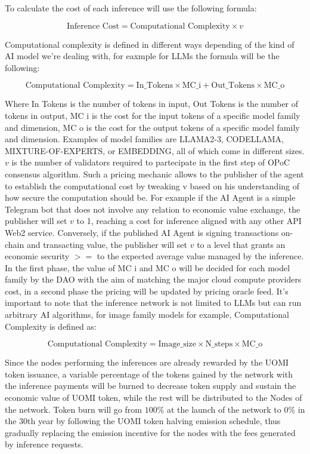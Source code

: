 \documentclass{article}
\begin{document}
To calculate the cost of each inference will use the following formula:





\[ \text{Inference Cost} = \text{Computational Complexity} \times v \]



Computational complexity is defined in different ways depending of the kind of AI model we’re dealing with, for eaxmple for LLMs the formula will be the following:

\[\text{Computational Complexity} = \text{In\_Tokens} \times \text{MC\_i} + \text{Out\_Tokens} \times \text{MC\_o} \]


Where In Tokens is the number of tokens in input, Out Tokens is the number of tokens in output, MC i is the cost for the input tokens of a specific model family and dimension, MC o is the cost for the output tokens of a specific model family and dimension.  Examples of model families are LLAMA2-3, CODELLAMA,  MIXTURE-OF-EXPERTS, or EMBEDDING, all of which come in different sizes.  \(v\) is the number of validators required to partecipate in the first step of OPoC consensus algorithm. Such a pricing mechanic allows to the publisher of the agent to establish the computational cost by tweaking v based on his understanding of how secure the computation should be. For example if the AI Agent is a simple Telegram bot that does not involve any relation to economic value exchange, the publisher will set \(v\) to 1, reaching a cost for inference aligned with any other API Web2 service. Conversely, if the published AI Agent is signing transactions on-chain and transacting value, the publisher will set \(v\) to a level that grants an economic security \(>=\) to the expected average value managed by the inference. 
In the first phase, the value of MC i and MC o will be decided for each model family by the DAO with the aim of matching the major cloud compute providers cost, in a second phase the pricing will be updated by pricing oracle feed. It's important to note that the inference network is not limited to LLMs but can run arbitrary AI algorithms, for image family models for example, Computational Complexity is defined as: 

\[\text{Computational Complexity} = \text{Image\_size} \times \text{N\_steps} \times \text{MC\_o} \]

Since the nodes performing the inferences are already rewarded by the UOMI token issuance, a variable percentage of the tokens gained by the network with the inference payments will be burned to decrease token supply and sustain the economic value of UOMI token, while the rest will be distributed to the Nodes of the network. 
Token burn will go from \( 100\%\) at the launch of the network to \( 0\%\) in the 30th year by following the UOMI token halving emission schedule, thus gradually replacing the emission incentive for the nodes with the fees generated by inference requests. 
\end{document}
